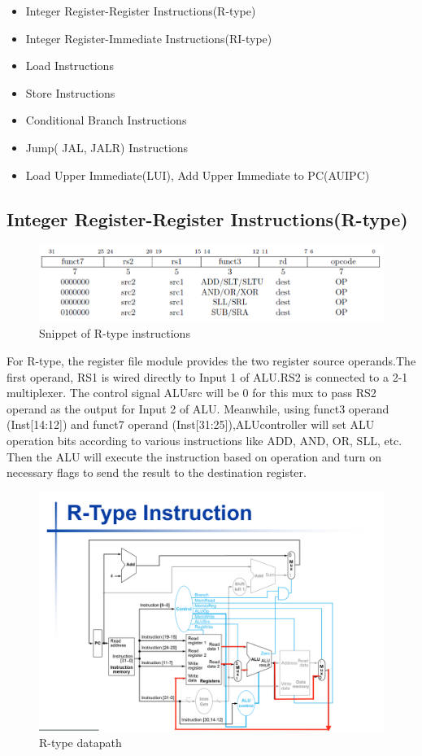 \documentclass[20pt]{article}
\begin{document}
\begin{itemize}
    \item Integer Register-Register Instructions(R-type)
    \item Integer Register-Immediate Instructions(RI-type)
    \item Load Instructions
    \item Store Instructions
    \item Conditional Branch Instructions
    \item Jump( JAL, JALR) Instructions
    \item Load Upper Immediate(LUI), Add Upper Immediate to PC(AUIPC)
\end{itemize}
\newpage
\subsection{Integer Register-Register Instructions(R-type)}

\begin{figure}[H]
\includegraphics[width=\linewidth]{RType}
\caption{Snippet of R-type instructions}
\end{figure}

For R-type, the register file module provides the two register source operands.The first operand, RS1 is wired directly to Input 1 of ALU.RS2 is connected to a 2-1 multiplexer. The control signal ALUsrc will be 0 for this mux to pass RS2 operand as the output for Input 2 of ALU. Meanwhile, using funct3 operand (Inst[14:12]) and funct7 operand (Inst[31:25]),ALUcontroller will set ALU operation bits according to various instructions like ADD, AND, OR, SLL, etc. Then the ALU will execute the instruction based on operation and turn on necessary flags to send the result to the destination register.

\begin{figure}[h]
\includegraphics[width=\linewidth]{Rtypepath}
\caption{R-type datapath}
\end{figure}
\end{document}
